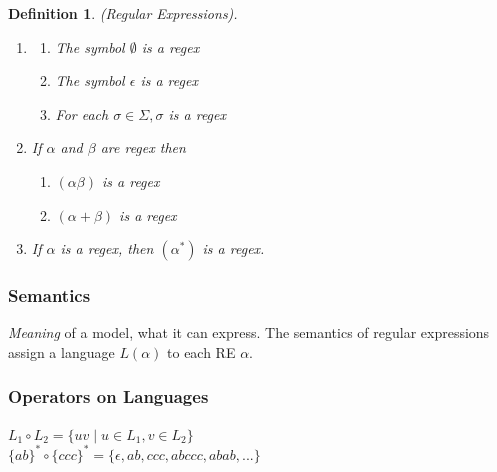 \documentclass[a3paper, 8pt]{extarticle}
\newtheorem*{definition}{Definition}
\begin{document}
\begin{multicols*}{6}
\begin{definition} (Regular Expressions).
    \begin{enumerate}
        \item \begin{enumerate}
            \item[a)] The symbol $\emptyset$ is a regex
            \item[b)] The symbol $\epsilon$ is a regex
            \item[c)] For each $\sigma \in \Sigma, \sigma$ is a regex
        \end{enumerate}
        \item If $\alpha$ and $\beta$ are regex then
        \begin{enumerate}
            \item[a)] $(\alpha \beta)$ is a regex
            \item[b)] $(\alpha + \beta)$ is a regex
        \end{enumerate}
        \item If $\alpha$ is a regex, then $(\alpha^*)$ is a regex.
    \end{enumerate}
\end{definition}
    
    \subsubsection{Semantics} 
    \textit{Meaning} of a model, what it can express. The semantics of regular expressions assign a language $L(\alpha)$ to each RE $\alpha$.
    
    \subsubsection{Operators on Languages}
        
        $L_1 \circ L_2 = \{uv \;|\; u \in L_1, v \in L_2\}$\\
    $\{ab\}^* \circ \{ccc\}^* = \{ \epsilon, ab, ccc, abccc, abab, ...\}$
    

\end{multicols*}
\end{document}
